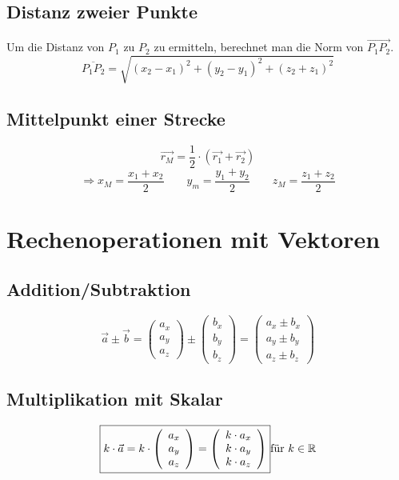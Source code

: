 \subsection{Distanz zweier Punkte}
Um die Distanz von $P_1$ zu $P_2$ zu ermitteln, berechnet man die Norm von 
$\overrightarrow{P_1P_2}$.
\[ \boxed{
   \overline{P_1P_2} = \sqrt{ (x_2 - x_1)^2 + (y_2 - y_1)^2 + (z_2 + z_1)^2 }
   }
\]

\subsection{Mittelpunkt einer Strecke}
\[ \boxed{ \vec{r_M} = \frac{1}{2} \cdot (\vec{r_1} + \vec{r_2}) } \]
\[ \boxed{ \Rightarrow x_M = \frac{x_1 + x_2}{2} \qquad
y_m = \frac{y_1 + y_2}{2} \qquad z_M = \frac{z_1 + z_2}{2} } \]

\section{Rechenoperationen mit Vektoren}

\subsection{Addition/Subtraktion}
\[ \boxed{ \vec{a}\pm\vec{b} =  
    \left( 
	  \begin{array}{ccc} 
	    a_x \\ a_y \\ a_z
	  \end{array}
	\right)
	\pm
	\left( 
	  \begin{array}{ccc} 
	    b_x \\ b_y \\ b_z
	  \end{array}
	\right)
	=
	\left( 
	  \begin{array}{ccc} 
	    a_x \pm b_x \\ a_y \pm b_y \\ a_z \pm b_z
	  \end{array}
	\right)
} \]

\subsection{Multiplikation mit Skalar}
\[ \boxed{ k \cdot \vec{a} = k \cdot 
\left( 
	  \begin{array}{ccc} 
	    a_x \\ a_y \\ a_z
	  \end{array}
	\right)
	=
	\left( 
	  \begin{array}{ccc} 
	    k \cdot a_x \\ k \cdot a_y \\ k \cdot a_z
	  \end{array}
	\right)
	} \\ \text{für } k \in \mathbb{R}
\]

